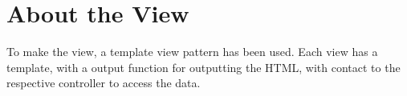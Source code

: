 \section{About the View}
To make the view, a template view pattern has been used. Each view has a template, with a output function for outputting the HTML, with contact to the respective controller to access the data.